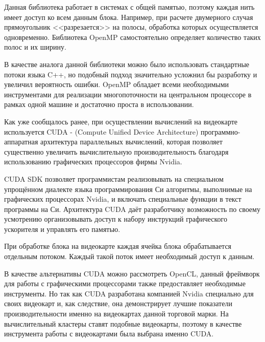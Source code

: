 \documentclass[a4paper, 14pt]{article}
\theoremstyle{definition}
\begin{document}
\par Данная библиотека работает в системах с общей памятью, поэтому каждая нить имеет доступ ко всем данным блока. Например, при расчете двумерного случая прямоугольник <<разрезается>> на полосы, обработка которых осуществляется одновременно. Библиотека OpenMP самостоятельно определяет количество таких полос и их ширину.

\par В качестве аналога данной библиотеки можно было использовать стандартные потоки языка C++, но подобный подход значительно усложнил бы разработку и увеличил вероятность ошибки. OpenMP обладает всеми необходимыми инструментами для реализации многопоточности на центральном процессоре в рамках одной машине и достаточно проста в использовании.


\par Как уже сообщалось ранее, при осуществлении вычислений на видеокарте используется CUDA - (Compute Unified Device Architecture) программно-аппаратная архитектура параллельных вычислений, которая позволяет существенно увеличить вычислительную производительность благодаря использованию графических процессоров фирмы Nvidia.

\par CUDA SDK позволяет программистам реализовывать на специальном упрощённом диалекте языка программирования Си алгоритмы, выполнимые на графических процессорах Nvidia, и включать специальные функции в текст программы на Си. Архитектура CUDA даёт разработчику возможность по своему усмотрению организовывать доступ к набору инструкций графического ускорителя и управлять его памятью.

\par При обработке блока на видеокарте каждая ячейка блока обрабатывается отдельным потоком. Каждый такой поток имеет необходимый доступ к данным.

\par В качестве альтернативы CUDA можно рассмотреть OpenCL, данный фреймворк для работы с графическими процессорами также предоставляет необходимые инструменты. Но так как CUDA разработана компанией Nvidia специально для своих видеокарт и, как следствие, она демонстрирует лучшие показатели производительности именно на видеокартах данной торговой марки. На вычислительный кластеры ставят подобные видеокарты, поэтому в качестве инструмента работы с видеокартами была выбрана именно CUDA.
\end{document}
